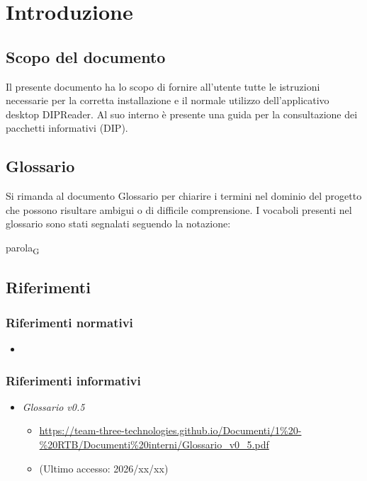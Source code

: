 \documentclass[a4paper,12pt]{article}
\begin{document}
    \section{Introduzione} {
        \subsection{Scopo del documento} {        
            Il presente documento ha lo scopo di fornire all'utente tutte le istruzioni necessarie per la corretta installazione e il normale utilizzo dell'applicativo desktop DIPReader.
            Al suo interno è presente una guida per la consultazione dei pacchetti informativi (DIP).
        }

        \subsection{Glossario} {
            Si rimanda al documento Glossario per chiarire i termini nel dominio del progetto che possono risultare ambigui o di difficile comprensione. I vocaboli presenti nel glossario sono stati segnalati seguendo la notazione:
            \begin{center}
                parola\textsubscript{G}
            \end{center}
        }
        
        \subsection{Riferimenti} {
            \subsubsection{Riferimenti normativi} {
                \begin{itemize}
                    \item
                \end{itemize}
            }
            \subsubsection{Riferimenti informativi} {
                \begin{itemize}
                    \item \textit{Glossario v0.5}
                    \begin{itemize}
                        \item \url{https://team-three-technologies.github.io/Documenti/1%20-%20RTB/Documenti%20interni/Glossario_v0_5.pdf}
                        \item[] (Ultimo accesso: 2026/xx/xx)
                    \end{itemize}
                \end{itemize}
            }
        }
    }
    
\end{document}
